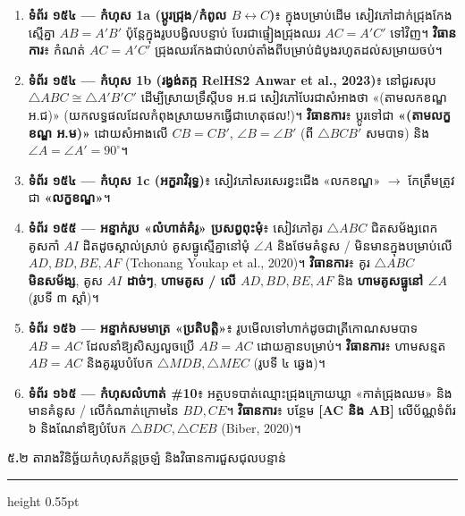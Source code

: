 \documentclass[a4paper,12pt]{article}
\newcommand{\en}[1]{{\TimesEn #1}}
\newcommand{\enbf}[1]{{\TimesEn\textbf{#1}}}
\newcommand{\tri}[1]{\ensuremath{\triangle #1}}
\newcommand{\ang}[1]{\ensuremath{\angle #1}}
\newcommand{\cg}{\ensuremath{\cong}}
\newcommand{\subsectitle}[1]{{\muol\fontsize{11pt}{14.5pt}\selectfont #1}}
\newcommand{\subsec}[1]{%
  \Needspace{1.6cm}%
  \vspace{4pt}%
  \subsectitle{#1}\par%
  \vspace{-2pt}%
  {\color{black}\hrule height 0.55pt}%
  \vspace{3.5pt}%
}
\begin{document}
\begin{enumerate}[leftmargin=0.65cm, itemsep=2.5pt]
  \item \textbf{ទំព័រ ១៥៤ — កំហុស \en{1a} (ប្ដូរជ្រុង/កំពូល $B \leftrightarrow C$)}៖ ក្នុងបម្រាប់ដើម សៀវភៅដាក់ជ្រុងកែងស្មើគ្នា $AB=A'B'$ ប៉ុន្តែក្នុងរូបបង្វិលបន្ទាប់ បែរជាផ្ទៀងជ្រុងឈរ $AC=A'C'$ ទៅវិញ។ \textbf{វិធានការ}៖ កំណត់ $AC=A'C'$ ជ្រុងឈរកែងជាប់លាប់តាំងពីបម្រាប់ដំបូងរហូតដល់សម្រាយចប់។
  \item \textbf{ទំព័រ ១៥៤ — កំហុស \en{1b} (រង្វង់តក្ក \en{RelHS2} \en{Anwar et al., 2023})}៖ នៅជួរសរុប $\tri{ABC}\cg\tri{A'B'C'}$ ដើម្បីស្រាយទ្រឹស្ដីបទ អ.ជ សៀវភៅបែរជាសំអាងថា «(តាមលកខណ្ឌ អ.ជ)» (យកលទ្ធផលដែលកំពុងស្រាយមកធ្វើជាហេតុផល!)។ \textbf{វិធានការ}៖ ប្ដូរទៅជា \textbf{«(តាមលក្ខខណ្ឌ អ.ម)»} ដោយសំអាងលើ $CB=CB'$, $\ang{B}=\ang{B'}$ (ពី $\tri{BCB'}$ សមបាទ) និង $\ang{A}=\ang{A'}=90^\circ$។
  \item \textbf{ទំព័រ ១៥៤ — កំហុស \en{1c} (អក្ខរាវិរុទ្ធ)}៖ សៀវភៅសរសេរខ្វះជើង «លកខណ្ឌ» $\to$ កែត្រឹមត្រូវជា \textbf{«លក្ខខណ្ឌ»}។
  \item \textbf{ទំព័រ ១៥៥ — អន្ទាក់រូប «លំហាត់គំរូ» ប្រសព្វពុះមុំ}៖ សៀវភៅគូរ $\tri{ABC}$ ជិតសម័ង្សពេក គូសកាំ $AI$ ដិតដូចស្គាល់ស្រាប់ គូសធ្នូស្មើគ្នានៅមុំ $\ang{A}$ និងថែមគំនូស \en{/} មិនមានក្នុងបម្រាប់លើ $AD, BD, BE, AF$ \en{(Tchonang Youkap et al., 2020)}។ \textbf{វិធានការ}៖ គូរ $\tri{ABC}$ \textbf{មិនសម័ង្ស}, គូស \textbf{$AI$ ដាច់ៗ}, \textbf{ហាមគូស \en{/} លើ $AD, BD, BE, AF$} និង \textbf{ហាមគូសធ្នូនៅ $\ang{A}$} (រូបទី ៣ ស្ដាំ)។
  \item \textbf{ទំព័រ ១៥៦ — អន្ទាក់សមមាត្រ «ប្រតិបត្តិ»}៖ រូបមើលទៅហាក់ដូចជាត្រីកោណសមបាទ $AB=AC$ ដែលនាំឱ្យសិស្សលួចប្រើ $AB=AC$ ដោយគ្មានបម្រាប់។ \textbf{វិធានការ}៖ ហាមសន្មត $AB=AC$ និងគូររូបបំបែក $\tri{MDB}, \tri{MEC}$ (រូបទី ៤ ឆ្វេង)។
  \item \textbf{ទំព័រ ១៦៥ — កំហុសលំហាត់ \en{\#10}}៖ អត្ថបទបាត់ឈ្មោះជ្រុងក្រោយឃ្លា «កាត់ជ្រុងឈម» និងមានគំនូស \en{/} លើកំណាត់ក្រោមនៃ $BD, CE$។ \textbf{វិធានការ}៖ បន្ថែម \textbf{\en{[AC} និង \en{AB]}} លើប័ណ្ណទំព័រ ៦ និងណែនាំឱ្យបំបែក $\tri{BDC}, \tri{CEB}$ \en{(Biber, 2020)}។
\end{enumerate}

\subsec{៥\enbf{.}២ តារាងវិនិច្ឆ័យកំហុសភ័ន្តច្រឡំ និងវិធានការជួសជុលបន្ទាន់}
\end{document}
